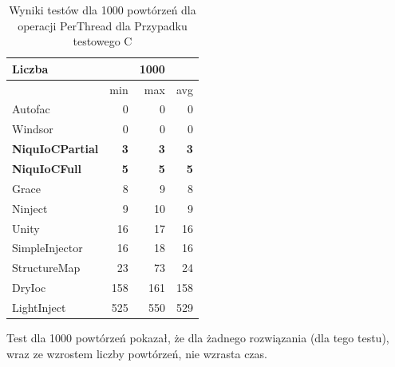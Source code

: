 \documentclass[12pt]{article}
\begin{document}
\begin{table}[H]
\captionsetup{belowskip=0pt,aboveskip=0pt}
\begin{center}
\begin{small}
	\begin{tabular}{ | l | r r r | }
    		\hline
Liczba & & 1000 & \\ \hline
 & min & max & avg \\ \hline
Autofac & 0 & 0 & 0 \\ \hline
Windsor & 0 & 0 & 0 \\ \hline
\textbf{NiquIoCPartial} & \textbf{3} & \textbf{3} & \textbf{3} \\ \hline
\textbf{NiquIoCFull} & \textbf{5} & \textbf{5} & \textbf{5} \\ \hline
Grace & 8 & 9 & 8 \\ \hline
Ninject & 9 & 10 & 9 \\ \hline
Unity & 16 & 17 & 16 \\ \hline
SimpleInjector & 16 & 18 & 16 \\ \hline
StructureMap & 23 & 73 & 24 \\ \hline
DryIoc & 158 & 161 & 158 \\ \hline
LightInject & 525 & 550 & 529 \\ \hline
  	\end{tabular}
\end{small}
\end{center}
\caption{Wyniki testów dla 1000 powtórzeń dla operacji PerThread dla Przypadku testowego C}
\label{TestCaseC_PerThread1000}
\end{table}
Test dla 1000 powtórzeń pokazał, że dla żadnego rozwiązania (dla tego testu), wraz ze wzrostem liczby powtórzeń, nie wzrasta czas.
\end{document}
